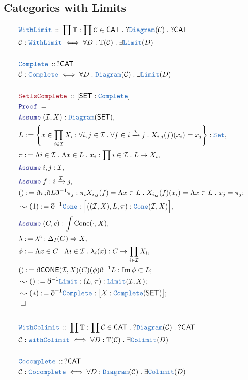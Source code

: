 \documentclass[12pt]{scrartcl}
\newcommand{\TYPE}[1]{\textcolor{NavyBlue}{\mathtt{#1}}}
\newcommand{\LOGIC}[1]{\textcolor{Blue}{\mathtt{#1}}}
\newcommand{\THM}[1]{\textcolor{Maroon}{\mathtt{#1}}}
\renewcommand{\.}{\; . \;}
\newcommand{\de}{: \kern 0.1pc =}
\newcommand{\Theorem}[2]{& \THM{#1} \, :: \, #2 \\ & \Proof = \\ }
\newcommand{\DeclareType}[2]{& \TYPE{#1} \, :: \, #2 \\}
\newcommand{\DefineType}[3]{& #1 : \TYPE{#2} \iff #3 \\}
\newcommand{\Page}[1]{ \begin{align*} #1 \end{align*}   }
\newcommand{ \bd }{ \ByDef }
\DeclareMathOperator*{\im}{Im}
\newcommand{\Arrow}{\xrightarrow}
\newcommand{\Set}{\TYPE{Set}}
\newcommand{\Say}[3]{& #1 \de #2 : #3, \\}
\newcommand{\Conclude}[3]{& #1 \de #2 : #3; \\}
\newcommand{\Derive}[3]{& \leadsto #1 \de #2 : #3, \\}
\newcommand{\DeriveConclude}[3]{& \leadsto #1 \de #2 : #3 ; \\}
\newcommand{\Assume}[2]{& \LOGIC{Assume} \; #1 : #2, \\}
\newcommand{\QED}{\; \square}
\newcommand{\EndProof}{& \QED \\}
\newcommand{\ByDef}{\eth}
\newcommand{\Proof}{\LOGIC{Proof} \; }
\newcommand{\C}{\mathcal{C}}
\newcommand{\I}{\mathcal{I}}
\newcommand{\CAT}{\mathsf{CAT}}
\newcommand{\SET}{\mathsf{SET}}
\begin{document}
\subsection{Categories with Limits}
\Page{
	\DeclareType{WithLimit}{ \prod   \mathbb{T} : \prod \C \in \CAT \. ? \TYPE{Diagram}(\C) \. ?\CAT  }
	\DefineType{\C}{WithLimit}{ \forall D : \mathbb{T}(\C) \. \exists \TYPE{Limit}(D) }
	\\
	\DeclareType{Complete}{ ?\CAT }
	\DefineType{\C}{Complete}{\forall D : \TYPE{Diagram}(\C) \. \exists \TYPE{Limit}(D)}
	\\
	\Theorem{SetIsComplete}{[\SET : \TYPE{Complete} ] }
	\Assume{ (\I,X) }{ \TYPE{Diagram}(\SET)}
	\Say{L}
	{
		\left\{ x \in \prod_{i \in \I} X_i : \forall i,j \in \I \. \forall f \in i \Arrow{\I} j \. 
			X_{i,j}(f)(x_i) = x_j   \right\}
	}{\Set}
	\Say{\pi}{\Lambda i \in \I \. \Lambda x \in L \. x_i}{\prod i \in \I \. L \to X_i }
	\Assume{i,j}{\I}
	\Assume{f}{i \Arrow{\I} j}
	\Conclude{()}{\bd \pi_i \bd L \bd^{-1} \pi_j}
	{  \pi_i X_{i,j}(f) = \Lambda x \in L \. X_{i,j}(f)(x_i) =  \Lambda x \in L \. x_j = \pi_j  }
	\Derive{(1)}{\bd^{-1} \TYPE{Cone}  }{\Big[ \big((\I,X),L,\pi) : \TYPE{Cone}(\I,X) \Big] }
	\Assume{(C,c)}{\int \mathrm{Cone}(\cdot,X)}
	\Say{\lambda}{\lambda^c}{\Delta_{I}(C) \Rightarrow X}
	\Say{\phi}{\Lambda x \in C \. \Lambda i \in \I \. \lambda_i(x)}{ C \to \prod_{i \in \I} X_i   }
	\Conclude{()}{\bd \mathsf{CONE}(\I,X)(C)(\phi)\bd^{-1} L}{\im \phi \subset L }
	\DeriveConclude{()}{\bd^{-1} \TYPE{Limit}}{(L,\pi) : \TYPE{Limit}(\I, X) }
	\DeriveConclude{(*)}{\bd^{-1} \TYPE{Complete}}{ \big[X : \TYPE{Complete}(\SET)\big]  }
	\EndProof
	\\
	\DeclareType{WithColimit}{\prod \mathbb{T} : \prod \C \in \CAT \. ?\TYPE{Diagram}(\C) \. ?\CAT}
	\DefineType{\C}{WithColimit}{\forall D : \mathbb{T}(\C) \. \exists \TYPE{Colimit}(D)}
	\\
	\DeclareType{Cocomplete}{?\CAT}
	\DefineType{\C}{Cocomplete}{\forall D : \TYPE{Diagram}(\C) \. \exists \TYPE{Colimit}(D) }
}
\end{document}
